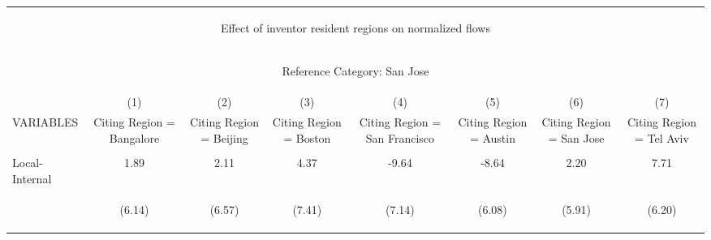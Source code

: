 \begin{center}
\begin{tabular}{lccccccc}
\multicolumn{8}{c}{\begin{large}Effect of inventor resident regions on normalized flows\end{large}} \\
\multicolumn{8}{c}{\begin{large}Reference Category: San Jose \label{reverse}\end{large}} \\ \hline
 & (1) & (2) & (3) & (4) & (5) & (6) & (7) \\
VARIABLES & Citing Region = Bangalore & Citing Region = Beijing & Citing Region = Boston & Citing Region = San Francisco & Citing Region = Austin & Citing Region = San Jose & Citing Region = Tel Aviv \\ \hline
\vspace{4pt} & \begin{footnotesize}\end{footnotesize} & \begin{footnotesize}\end{footnotesize} & \begin{footnotesize}\end{footnotesize} & \begin{footnotesize}\end{footnotesize} & \begin{footnotesize}\end{footnotesize} & \begin{footnotesize}\end{footnotesize} & \begin{footnotesize}\end{footnotesize} \\
Local-Internal & 1.89 & 2.11 & 4.37 & -9.64 & -8.64 & 2.20 & 7.71 \\
\vspace{4pt} & \begin{footnotesize}(6.14)\end{footnotesize} & \begin{footnotesize}(6.57)\end{footnotesize} & \begin{footnotesize}(7.41)\end{footnotesize} & \begin{footnotesize}(7.14)\end{footnotesize} & \begin{footnotesize}(6.08)\end{footnotesize} & \begin{footnotesize}(5.91)\end{footnotesize} & \begin{footnotesize}(6.20)\end{footnotesize} \\

\end{tabular}
\end{center}
